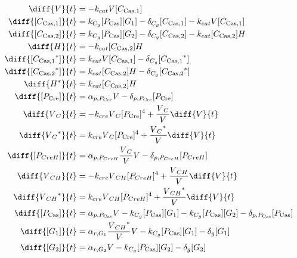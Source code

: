 \begin{align}
\diff{\vectorGen{}}{t} & = - \casCutRate{{}}\vectorGen{}\conc{\cplx{\cas}{1}}\\
\diff{\conc{\cplx{\cas}{1}}}{t} & =  \gRnaBind{}\conc{\proSp{\cas{}}}\conc{\gRna{1}} - \casCompDegradeRate{}\conc{\cplx{\cas}{1}} - \casCutRate{{}}\vectorGen{}\conc{\cplx{\cas}{1}}\\
\diff{\conc{\cplx{\cas}{2}}}{t} & =  \gRnaBind{}\conc{\proSp{\cas{}}}\conc{\gRna{2}} - \casCompDegradeRate{}\conc{\cplx{\cas}{2}} - \casCutRate{{}}\conc{\cplx{\cas}{2}}\hostGen{}\\
\diff{\hostGen{}}{t} & = - \casCutRate{{}}\conc{\cplx{\cas}{2}}\hostGen{}\\
\diff{\conc{\bound{\cplx{\cas}{1}}}}{t} & =  \casCutRate{{}}\vectorGen{}\conc{\cplx{\cas}{1}} - \casCompDegradeRate{}\conc{\bound{\cplx{\cas}{1}}}\\
\diff{\conc{\bound{\cplx{\cas}{2}}}}{t} & =  \casCutRate{{}}\conc{\cplx{\cas}{2}}\hostGen{} - \casCompDegradeRate{}\conc{\bound{\cplx{\cas}{2}}}\\
\diff{\edited{\hostGen{}}}{t} & =  \casCutRate{{}}\conc{\cplx{\cas}{2}}\hostGen{}\\
\diff{\conc{\proSp{\cre{}}}}{t} & =  \txtlRate{\proSp{\cre{}}}\vectorGen{} - \proDegradeRate{\proSp{\cre{}}}\conc{\proSp{\cre{}}}\\
\diff{\vectorGen{}_C}{t} & = - \creCutRate{} \vectorGen{}_C \conc{\proSp{\cre{}}}^4 + \frac{\vectorGen{}_C}{\vectorGen{}} \diff{\vectorGen{}}{t}\\
\diff{\edited{\vectorGen{}_C}}{t} & =  \creCutRate{} \vectorGen{}_C \conc{\proSp{\cre{}}}^4 + \frac{\edited{\vectorGen{}_C}}{\vectorGen{}} \diff{\vectorGen{}}{t}\\
\diff{\conc{\proSp{CreH}}}{t} & =  \txtlRate{\proSp{CreH}}\frac{\vectorGen{}_C}{\vectorGen{}}\vectorGen{} - \proDegradeRate{\proSp{CreH}}\conc{\proSp{CreH}}\\
\diff{\vectorGen{}_{CH}}{t} & = - \creCutRate{} \vectorGen{}_{CH} \conc{\proSp{CreH}}^4 + \frac{\vectorGen{}_{CH}}{\vectorGen{}} \diff{\vectorGen{}}{t}\\
\diff{\edited{\vectorGen{}_{CH}}}{t} & =  \creCutRate{} \vectorGen{}_{CH} \conc{\proSp{CreH}}^4 + \frac{\edited{\vectorGen{}_{CH}}}{\vectorGen{}} \diff{\vectorGen{}}{t}\\
\diff{\conc{\proSp{\cas{}}}}{t} & =  \txtlRate{\proSp{\cas{}}}\vectorGen{} - \gRnaBind{}\conc{\proSp{\cas{}}}\conc{\gRna{1}} - \gRnaBind{}\conc{\proSp{\cas{}}}\conc{\gRna{2}} - \proDegradeRate{\proSp{\cas{}}}\conc{\proSp{\cas{}}}\\
\diff{\conc{\gRna{1}}}{t} & =  \txRate{\gRna{1}}\frac{\edited{\vectorGen{}_{CH}}}{\vectorGen{}}\vectorGen{} - \gRnaBind{}\conc{\proSp{\cas{}}}\conc{\gRna{1}} - \rnaDegradeRate{}\conc{\gRna{1}}\\
\diff{\conc{\gRna{2}}}{t} & =  \txRate{\gRna{2}}\vectorGen{} - \gRnaBind{}\conc{\proSp{\cas{}}}\conc{\gRna{2}} - \rnaDegradeRate{}\conc{\gRna{2}}
\end{align}

